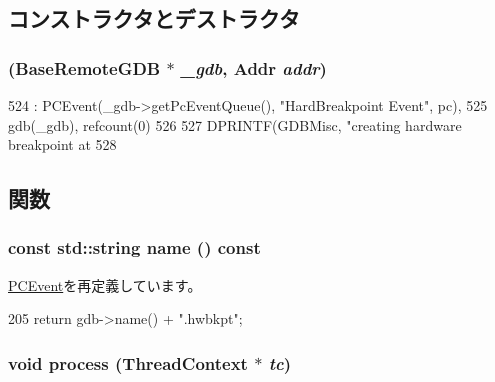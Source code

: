 \subsection{コンストラクタとデストラクタ}
\hypertarget{classBaseRemoteGDB_1_1HardBreakpoint_aa377dd693f72123285321aa65568be3d}{
\subsubsection[{HardBreakpoint}]{ ({\bf BaseRemoteGDB} $\ast$ {\em \_\-gdb}, \/  {\bf Addr} {\em addr})}}
\label{classBaseRemoteGDB_1_1HardBreakpoint_aa377dd693f72123285321aa65568be3d}



\begin{DoxyCode}
524     : PCEvent(_gdb->getPcEventQueue(), "HardBreakpoint Event", pc),
525       gdb(_gdb), refcount(0)
526 {
527     DPRINTF(GDBMisc, "creating hardware breakpoint at %
528 }
\end{DoxyCode}


\subsection{関数}
\hypertarget{classBaseRemoteGDB_1_1HardBreakpoint_a6490f765a824ced1cc94979609fe7e07}{
\subsubsection[{name}]{\setlength{\rightskip}{0pt plus 5cm}const std::string name () const}}
\label{classBaseRemoteGDB_1_1HardBreakpoint_a6490f765a824ced1cc94979609fe7e07}


\hyperlink{classPCEvent_adbcff144e5e199d332a1352af1798148}{PCEvent}を再定義しています。


\begin{DoxyCode}
205 { return gdb->name() + ".hwbkpt"; }
\end{DoxyCode}
\hypertarget{classBaseRemoteGDB_1_1HardBreakpoint_ad66a9d5ec7cfe597b848a17c0df5cc28}{
\subsubsection[{process}]{\setlength{\rightskip}{0pt plus 5cm}void process ({\bf ThreadContext} $\ast$ {\em tc})}}
\label{classBaseRemoteGDB_1_1HardBreakpoint_ad66a9d5ec7cfe597b848a17c0df5cc28}


